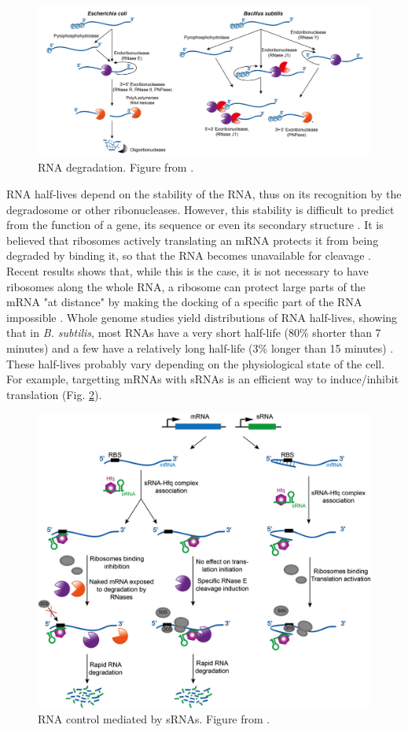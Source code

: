 \begin{figure}[!ht]
	\centering
	\includegraphics[width=0.9\linewidth]{figure/rnaDegradation}
	\caption{RNA degradation. Figure from \citet{bandyra_social_2013}.}
	\label{fig:rnaDegradation}
\end{figure}

RNA half-lives depend on the stability of the RNA, thus on its recognition by the degradosome or other ribonucleases. However, this stability is difficult to predict from the function of a gene, its sequence or even its secondary structure \citep{hambraeus_genome-wide_2013}. It is believed that ribosomes actively translating an mRNA protects it from being degraded by binding it, so that the RNA becomes unavailable for cleavage \citep{bandyra_licensing_2013}. Recent results shows that, while this is the case, it is not necessary to have ribosomes along the whole RNA, a ribosome can protect large parts of the mRNA "at distance" by making the docking of a specific part of the RNA impossible \citep{laalami_initiation_2013}. Whole genome studies yield distributions of RNA half-lives, showing that in \textit{B. subtilis}, most RNAs have a very short half-life (80\% shorter than 7 minutes) and a few have a relatively long half-life (3\% longer than 15 minutes) \citep{hambraeus_genome-wide_2013}. These half-lives probably vary depending on the physiological state of the cell. For example, targetting mRNAs with sRNAs is an efficient way to induce/inhibit translation (Fig. \ref{fig:srnaDegradation}).

\begin{figure}[!ht]
	\centering
	\includegraphics[width=0.9\linewidth]{figure/srnaDegradation}
	\caption{RNA control mediated by sRNAs. Figure from \citet{bandyra_social_2013}.}
	\label{fig:srnaDegradation}
\end{figure}